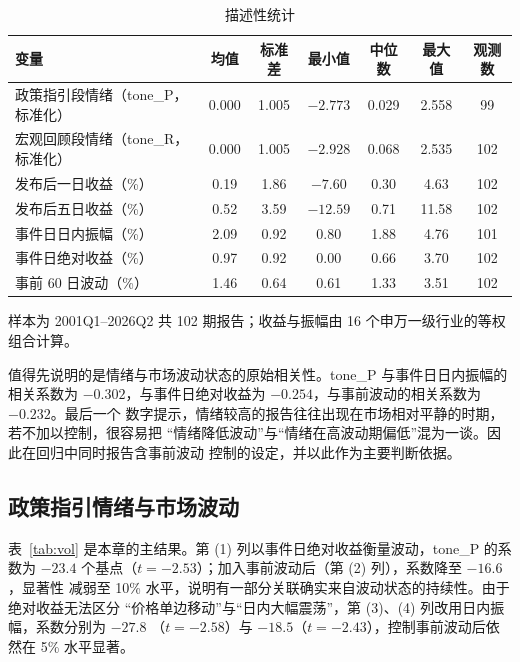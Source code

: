 \begin{table}[htbp]
\centering
\small
\begin{threeparttable}
\caption{描述性统计}
\label{tab:desc}
\begin{tabular}{lcccccc}
\toprule
变量 & 均值 & 标准差 & 最小值 & 中位数 & 最大值 & 观测数 \\
\midrule
政策指引段情绪（tone\_P，标准化） & 0.000 & 1.005 & $-2.773$ & 0.029 & 2.558 & 99 \\
宏观回顾段情绪（tone\_R，标准化） & 0.000 & 1.005 & $-2.928$ & 0.068 & 2.535 & 102 \\
发布后一日收益（\%）              & 0.19  & 1.86  & $-7.60$ & 0.30  & 4.63  & 102 \\
发布后五日收益（\%）              & 0.52  & 3.59  & $-12.59$ & 0.71 & 11.58 & 102 \\
事件日日内振幅（\%）              & 2.09  & 0.92  & 0.80  & 1.88  & 4.76  & 101 \\
事件日绝对收益（\%）              & 0.97  & 0.92  & 0.00  & 0.66  & 3.70  & 102 \\
事前 60 日波动（\%）              & 1.46  & 0.64  & 0.61  & 1.33  & 3.51  & 102 \\
\bottomrule
\end{tabular}
\begin{tablenotes}[flushleft]
\footnotesize
\item 样本为 2001Q1--2026Q2 共 102 期报告；收益与振幅由 16 个申万一级行业的等权组合计算。
\end{tablenotes}
\end{threeparttable}
\end{table}

值得先说明的是情绪与市场波动状态的原始相关性。tone\_P 与事件日日内振幅的相关系数为
$-0.302$，与事件日绝对收益为 $-0.254$，与事前波动的相关系数为 $-0.232$。最后一个
数字提示，情绪较高的报告往往出现在市场相对平静的时期，若不加以控制，很容易把
``情绪降低波动''与``情绪在高波动期偏低''混为一谈。因此在回归中同时报告含事前波动
控制的设定，并以此作为主要判断依据。

\subsection{政策指引情绪与市场波动}

表~\ref{tab:vol} 是本章的主结果。第 (1) 列以事件日绝对收益衡量波动，tone\_P 的系数为
$-23.4$ 个基点（$t=-2.53$）；加入事前波动后（第 (2) 列），系数降至 $-16.6$，显著性
减弱至 10\% 水平，说明有一部分关联确实来自波动状态的持续性。由于绝对收益无法区分
``价格单边移动''与``日内大幅震荡''，第 (3)、(4) 列改用日内振幅，系数分别为 $-27.8$
（$t=-2.58$）与 $-18.5$（$t=-2.43$），控制事前波动后依然在 5\% 水平显著。

